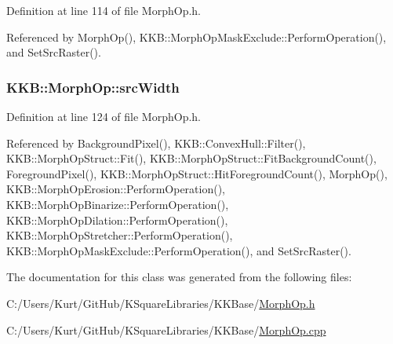 Definition at line 114 of file Morph\+Op.\+h.



Referenced by Morph\+Op(), K\+K\+B\+::\+Morph\+Op\+Mask\+Exclude\+::\+Perform\+Operation(), and Set\+Src\+Raster().

\subsubsection[{\texorpdfstring{src\+Width}{srcWidth}}]{ K\+K\+B\+::\+Morph\+Op\+::src\+Width\hspace{0.3cm}{\ttfamily [protected]}}\hypertarget{class_k_k_b_1_1_morph_op_aec2cfb3015497e4077751fc5f19559ab}{}\label{class_k_k_b_1_1_morph_op_aec2cfb3015497e4077751fc5f19559ab}


Definition at line 124 of file Morph\+Op.\+h.



Referenced by Background\+Pixel(), K\+K\+B\+::\+Convex\+Hull\+::\+Filter(), K\+K\+B\+::\+Morph\+Op\+Struct\+::\+Fit(), K\+K\+B\+::\+Morph\+Op\+Struct\+::\+Fit\+Background\+Count(), Foreground\+Pixel(), K\+K\+B\+::\+Morph\+Op\+Struct\+::\+Hit\+Foreground\+Count(), Morph\+Op(), K\+K\+B\+::\+Morph\+Op\+Erosion\+::\+Perform\+Operation(), K\+K\+B\+::\+Morph\+Op\+Binarize\+::\+Perform\+Operation(), K\+K\+B\+::\+Morph\+Op\+Dilation\+::\+Perform\+Operation(), K\+K\+B\+::\+Morph\+Op\+Stretcher\+::\+Perform\+Operation(), K\+K\+B\+::\+Morph\+Op\+Mask\+Exclude\+::\+Perform\+Operation(), and Set\+Src\+Raster().



The documentation for this class was generated from the following files\+:\begin{DoxyCompactItemize}
\item 
C\+:/\+Users/\+Kurt/\+Git\+Hub/\+K\+Square\+Libraries/\+K\+K\+Base/\hyperlink{_morph_op_8h}{Morph\+Op.\+h}\item 
C\+:/\+Users/\+Kurt/\+Git\+Hub/\+K\+Square\+Libraries/\+K\+K\+Base/\hyperlink{_morph_op_8cpp}{Morph\+Op.\+cpp}\end{DoxyCompactItemize}
